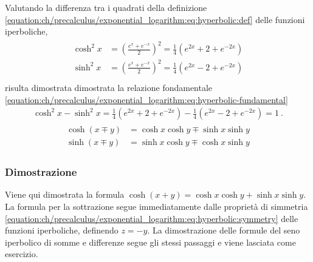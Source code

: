 \documentclass[letterpaper,10pt,italian]{jupyterBook}
\begin{document}
\sphinxAtStartPar
Valutando la differenza tra i quadrati della definizione \eqref{equation:ch/precalculus/exponential_logarithm:eq:hyperbolic:def} delle funzioni iperboliche,
\begin{equation*}
\begin{split}\begin{aligned}
 \cosh^2 x & = \left(\frac{e^x + e^{-x}}{2}\right)^2 = \frac{1}{4} \left( e^{2x} + 2 + e^{-2x} \right) \\
 \sinh^2 x & = \left(\frac{e^x + e^{-x}}{2}\right)^2 = \frac{1}{4} \left( e^{2x} - 2 + e^{-2x} \right) \\
\end{aligned}\end{split}
\end{equation*}
\sphinxAtStartPar
risulta dimostrata dimostrata la relazione fondamentale \eqref{equation:ch/precalculus/exponential_logarithm:eq:hyperbolic-fundamental}
\begin{equation*}
\begin{split}\cosh^2 x - \sinh^2 x = \frac{1}{4} \left( e^{2x} + 2 + e^{-2x} \right) - \frac{1}{4} \left( e^{2x} - 2 + e^{-2x} \right) = 1 \ .\end{split}
\end{equation*}
\sphinxAtStartPar
{}
\begin{equation}\label{equation:ch/precalculus/exponential_logarithm:eq:hyperbolic:sum-diff}
\begin{split}\begin{aligned}
  \cosh(x \mp y) & = \cosh x \cosh y \mp \sinh x \sinh y \\
  \sinh(x \mp y) & = \sinh x \cosh y \mp \cosh x \sinh y 
\end{aligned}\end{split}
\end{equation}\subsubsection*{Dimostrazione}

\sphinxAtStartPar
Viene qui dimostrata la formula \(\cosh(x+y) = \cosh x \cosh y + \sinh x \sinh y\). La formula per la sottrazione segue immediatamente dalle proprietà di simmetria \eqref{equation:ch/precalculus/exponential_logarithm:eq:hyperbolic:symmetry} delle funzioni iperboliche, definendo \(z = -y\). La dimostrazione delle formule del seno iperbolico di somme e differenze segue gli stessi passaggi e viene lasciata come esercizio.
\end{document}
